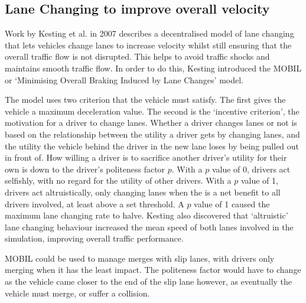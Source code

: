 \subsection{Lane Changing to improve overall velocity}
\label{subsec:Lane Changing to improve overall velocity}
Work by Kesting et al. in 2007 \citep{Kesting2007} describes a decentralised model of lane changing that lets vehicles change lanes to increase velocity whilst still ensuring that the overall traffic flow is not disrupted. This helps to avoid traffic shocks and maintains smooth traffic flow. In order to do this, Kesting introduced the MOBIL or `Minimising Overall Braking Induced by Lane Changes' model.

The model uses two criterion that the vehicle must satisfy. The first gives the vehicle a maximum deceleration value. The second is the `incentive criterion', the motivation for a driver to change lanes. Whether a driver changes lanes or not is based on the relationship between the utility a driver gets by changing lanes, and the utility the vehicle behind the driver in the new lane loses by being pulled out in front of. How willing a driver is to sacrifice another driver's utility for their own is down to the driver's politeness factor $p$. With a $p$ value of 0, drivers act selfishly, with no regard for the utility of other drivers. With a $p$ value of 1, drivers act altruistically, only changing lanes when the is a net benefit to all drivers involved, at least above a set threshold. A $p$ value of 1 caused the maximum lane changing rate to halve. Kesting also discovered that `altruistic' lane changing behaviour increased the mean speed of both lanes involved in the simulation, improving overall traffic performance.

MOBIL could be used to manage merges with slip lanes, with drivers only merging when it has the least impact. The politeness factor would have to change as the vehicle came closer to the end of the slip lane however, as eventually the vehicle must merge, or suffer a collision. 